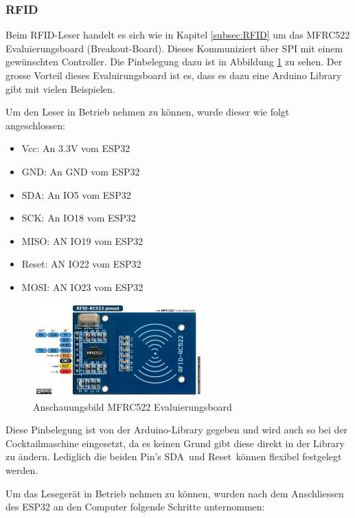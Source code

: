 \subsubsection{RFID}
\label{subsubsec:Inbetriebnahme_RFID}

Beim RFID-Leser handelt es sich wie in Kapitel \ref{subsec:RFID} um das MFRC522 Evaluierungsboard (Breakout-Board). Dieses Kommuniziert über SPI mit einem gewünschten Controller. Die Pinbelegung dazu ist in Abbildung \ref{fig:MFRC522} zu sehen. Der grosse Vorteil dieses Evaluirungsboard ist es, dass es dazu eine Arduino Library gibt mit vielen Beispielen.

Um den Leser in Betrieb nehmen zu können, wurde dieser wie folgt angeschlossen:


\begin{itemize}
\item Vcc: An 3.3V vom ESP32
\item GND: An GND vom ESP32
\item SDA: An IO5 vom ESP32
\item SCK: An IO18 vom ESP32
\item MISO: AN IO19 vom ESP32
\item Reset: AN IO22 vom ESP32
\item MOSI: AN IO23 vom ESP32
\end{itemize}

\begin{figure}[h!]
\center
\includegraphics[width = 0.58\textwidth]{graphics/MFRC522}
\caption{Anschauungsbild MFRC522 Evaluierungsboard}
\label{fig:MFRC522}
\end{figure}

Diese Pinbelegung ist von der Arduino-Library gegeben und wird auch so bei der Cocktailmaschine eingesetzt, da es keinen Grund gibt diese direkt in der Library zu ändern. Lediglich die beiden Pin's \flqq SDA\frqq~und \flqq Reset\frqq~können flexibel festgelegt werden.

Um das Lesegerät in Betrieb nehmen zu können, wurden nach dem Anschliessen des ESP32 an den Computer folgende Schritte unternommen: 

